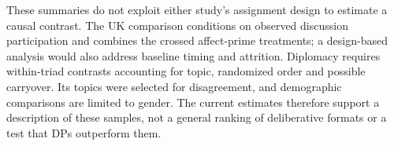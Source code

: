 \documentclass[11pt]{article}
\begin{document}
These summaries do not exploit either study's assignment design to estimate a
causal contrast. The UK comparison conditions on observed discussion participation
and combines the crossed affect-prime treatments; a design-based analysis would
also address baseline timing and attrition. Diplomacy requires within-triad
contrasts accounting for topic, randomized order and possible carryover. Its
topics were selected for disagreement, and demographic comparisons are limited
to gender. The current estimates therefore support a description of these samples,
not a general ranking of deliberative formats or a test that DPs outperform them.
\end{document}
